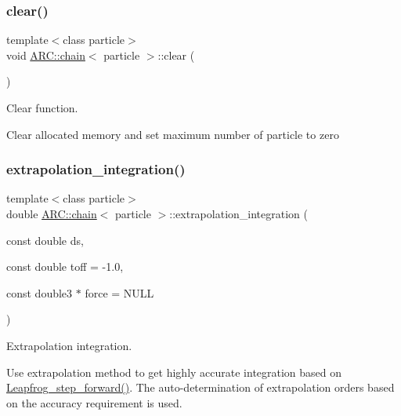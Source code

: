 \subsubsection{\texorpdfstring{clear()}{clear()}}
{\footnotesize\ttfamily template$<$class particle$>$ \\
void \hyperlink{classARC_1_1chain}{A\+R\+C\+::chain}$<$ particle $>$\+::clear (\begin{DoxyParamCaption}{ }\end{DoxyParamCaption})\hspace{0.3cm}{\ttfamily [inline]}}



Clear function. 

Clear allocated memory and set maximum number of particle to zero \hypertarget{classARC_1_1chain_ab831215debbd09466cadb1b961dd0a18}{}\label{classARC_1_1chain_ab831215debbd09466cadb1b961dd0a18} 
\subsubsection{\texorpdfstring{extrapolation\+\_\+integration()}{extrapolation\_integration()}}
{\footnotesize\ttfamily template$<$class particle$>$ \\
double \hyperlink{classARC_1_1chain}{A\+R\+C\+::chain}$<$ particle $>$\+::extrapolation\+\_\+integration (\begin{DoxyParamCaption}\item[{const double}]{ds,  }\item[{const double}]{toff = {\ttfamily -\/1.0},  }\item[{const double3 $\ast$}]{force = {\ttfamily NULL} }\end{DoxyParamCaption})\hspace{0.3cm}{\ttfamily [inline]}}



Extrapolation integration. 

Use extrapolation method to get highly accurate integration based on \hyperlink{classARC_1_1chain_a82b26731761231d86fd2e0b4529df6fa}{Leapfrog\+\_\+step\+\_\+forward()}. The auto-\/determination of extrapolation orders based on the accuracy requirement is used.


